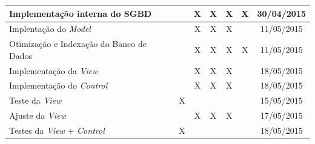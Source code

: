 \documentclass[a4paper,12pt]{article}
\begin{document}
\begin{longtable}{|p{3cm}|c|c|c|c|c|c|}
Implementação interna do SGBD             &                                          & X                                      & X                                     & X                                      & X                                     & 30/04/2015                                \\ \hline
Implentação do \textit{Model}                      &                                          & X                                      & X                                     & X                                      &                                       & 11/05/2015                                \\ \hline
Otimização e Indexação do Banco de Dados    &                                          & X                                      & X                                     & X                                      & X                                     & 11/05/2015                                \\ \hline
Implementação da \textit{View}                     &                                          & X                                      & X                                     & X                                      &                                       & 18/05/2015                                \\ \hline
Implementação do \textit{Control}                  &                                          & X                                      & X                                     & X                                      &                                       & 18/05/2015                                \\ \hline
Teste da \textit{View}                            & X                                        &                                        &                                       &                                        &                                       & 15/05/2015                                \\ \hline
Ajuste da \textit{View}                           &                                          & X                                      & X                                     & X                                      &                                       & 17/05/2015                                \\ \hline
Testes da \textit{View} + \textit{Control}                  & X                                        &                                        &                                       &                                        &                                       & 18/05/2015                                \\ \hline

\end{longtable}
\end{document}
